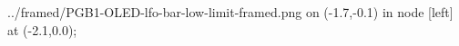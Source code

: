 \documentclass[preview]{standalone}
\begin{document}
\begin{zoomed}{../framed/PGB1-OLED-lfo-bar-low-limit-framed.png}
  \spy [gray, size=1.0cm] on (-1.7,-0.1) in node [left] at (-2.1,0.0);
\end{zoomed}
\end{document}
